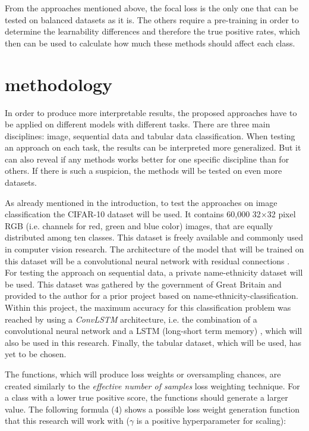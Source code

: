 \documentclass[journal]{IEEEtran}
\begin{document}
From the approaches mentioned above, the focal loss is the only one that can be tested on balanced datasets as it is. 
The others require a pre-training in order to determine the learnability differences and therefore the true positive rates, which then can be used to calculate how much these methods should affect each class.

\section{methodology}
In order to produce more interpretable results, the proposed approaches have to be applied on different models with different tasks. 
There are three main disciplines: image, sequential data and tabular data classification. 
When testing an approach on each task, the results can be interpreted more generalized. 
But it can also reveal if any methods works better for one specific discipline than for others. 
If there is such a suspicion, the methods will be tested on even more datasets.

As already mentioned in the introduction, to test the approaches on image classification the CIFAR-10 dataset will be used.
It contains 60,000 32$\times$32 pixel RGB (i.e. channels for red, green and blue color) images, that are equally distributed among ten classes.
This dataset is freely available and commonly used in computer vision research.
The architecture of the model that will be trained on this dataset will be a convolutional neural network \cite{lecun1989backpropagation} with residual connections \cite{he2016deep}.
For testing the approach on sequential data, a private name-ethnicity dataset will be used.
This dataset was gathered by the government of Great Britain and provided to the author for a prior project based on name-ethnicity-classification.
Within this project, the maximum accuracy for this classification problem was reached by using a \emph{ConvLSTM} architecture, i.e. the combination of a convolutional neural network and a LSTM (long-short term memory) \cite{gers2000learning}, which will also be used in this research. 
Finally, the tabular dataset, which will be used, has yet to be chosen.

The functions, which will produce loss weights or oversampling chances, are created similarly to the \emph{effective number of samples} loss weighting technique. 
For a class with a lower true positive score, the functions should generate a larger value. 
The following formula (4) shows a possible loss weight generation function that this research will work with ($\gamma$ is a positive hyperparameter for scaling):
\end{document}
